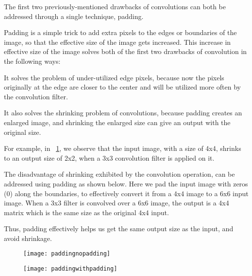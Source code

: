 	\begin{bulletedlist}
		\item The first two previously-mentioned drawbacks of convolutions can both be addressed through a single technique, padding.
		\item Padding is a simple trick to add extra pixels to the edges or boundaries of the image, so that the effective size of the image gets increased. This increase in effective size of the image solves both of the first two drawbacks of convolution in the following ways:
		\begin{bulletedlist}
			\item It solves the problem of under-utilized edge pixels, because now the pixels originally at the edge are closer to the center and will be utilized more often by the convolution filter.
			\item It also solves the shrinking problem of convolutions, because padding creates an enlarged image, and shrinking the enlarged size can give an output with the original size.
		\end{bulletedlist}
		\item For example, in \figurename~\ref{fig:paddingnopadding}, we observe that the input image, with a size of 4x4, shrinks to an output size of 2x2, when a 3x3 convolution filter is applied on it.
		\item The disadvantage of shrinking exhibited by the convolution operation, can be addressed using padding as shown below.  Here we pad the input image with zeros (0) along the boundaries, to effectively convert it from a 4x4 image to a 6x6 input image.  When a 3x3 filter is convolved over a 6x6 image, the output is a 4x4 matrix which is the same size as the original 4x4 input.
		\item Thus, padding effectively helps us get the same output size as the input, and avoid shrinkage.
	\end{bulletedlist}

	\begin{figure}[h]
		\centering
		\texttt{[image: paddingnopadding]}
		\caption{}
		\label{fig:paddingnopadding}
	\end{figure}
	\begin{figure}[h]
		\centering
		\texttt{[image: paddingwithpadding]}
		\caption{}
		\label{fig:paddingwithpadding}
	\end{figure}


